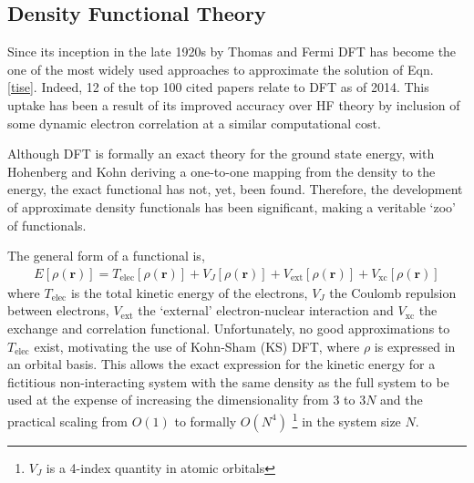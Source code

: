 \documentclass[main.tex]{subfiles}
\begin{document}
\subsection{Density Functional Theory}

Since its inception in the late 1920s by Thomas\cite{Thomas1927} and Fermi\cite{Fermi1928} DFT has become the one of the most widely used approaches to approximate the solution of Eqn. \eqref{tise}.\cite{Haunschild2019} Indeed, 12 of the top 100 cited papers relate to DFT as of 2014.\cite{VanNoorden2014} This uptake has been a result of its improved accuracy over HF theory by inclusion of some dynamic electron correlation at a similar computational cost.

Although DFT is formally an exact theory for the ground state energy, with Hohenberg and Kohn deriving a one-to-one mapping from the density to the energy,\cite{HohenbergKohn1964} the exact functional has not, yet, been found.\cite{Kanungo2019} Therefore, the development of approximate density functionals has been significant, making a veritable `zoo' of functionals.\cite{Mardirossian2017, Goerigk2017}

The general form of a functional is,
\begin{eqnarray}
E[\rho(\boldsymbol{r})] = T_\text{elec}[\rho(\boldsymbol{r})]  + V_{J}[\rho(\boldsymbol{r})] + V_\text{ext}[\rho(\boldsymbol{r})] + V_\text{xc}[\rho(\boldsymbol{r})] 
\end{eqnarray}
where $T_\text{elec}$ is the total kinetic energy of the electrons, $V_{J}$ the Coulomb repulsion between electrons, $V_\text{ext}$ the `external' electron-nuclear interaction and $V_\text{xc}$ the exchange and correlation functional. Unfortunately, no good approximations to $T_\text{elec}$ exist,\cite{OFDFT2009} motivating the use of Kohn-Sham (KS) DFT, where $\rho$ is expressed in an orbital basis.\cite{KS1965} This allows the exact expression for the kinetic energy for a fictitious non-interacting system with the same density as the full system to be used at the expense of increasing the dimensionality from 3 to 3$N$ and the practical scaling from $O(1)$ to formally $O(N^4)$ \footnote{$V_J$ is a 4-index quantity in atomic orbitals} in the system size $N$.\cite{Lignres2005}
\end{document}
